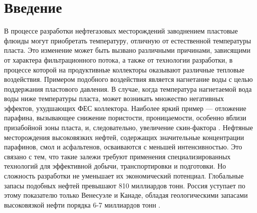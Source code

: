 \documentclass[12pt,twoside,a4paper]{uz_ku}
\begin{document}
\section*{Введение}

	В процессе разработки нефтегазовых месторождений заводнением пластовые флюиды могут приобретать температуру, отличную от естественной температуры пласта. Это изменение может быть вызвано различными причинами, зависящими от характера фильтрационного потока, а также от технологии разработки, в процессе которой на продуктивные коллекторы оказывают различные тепловые воздействия. Примером подобного воздействия является нагнетание воды с целью поддержания пластового давления. В случае, когда температура нагнетаемой вода воды ниже температуры пласта, может возникать множество негативных эффектов, ухудшающих ФЕС коллектора. Наиболее яркий пример — отложение парафина, вызывающее снижение пористости, проницаемости, особенно вблизи призабойной зоны пласта, и, следовательно, увеличение скин-фактора \cite{1}.
	Нефтяные месторождения высоковязких нефтей, содержащих значительные концентрации парафинов, смол и асфальтенов, осваиваются с меньшей интенсивностью. Это связано с тем, что такие залежи требуют применения специализированных технологий для эффективной добычи, транспортировки и подготовки. Но сложность разработки не уменьшает их экономический потенциал. Глобальные запасы подобных нефтей превышают 810 миллиардов тонн. Россия уступает по этому показателю только Венесуэле и Канаде, обладая геологическими запасами высоковязкой нефти порядка 6-7 миллиардов тонн \cite{1}.
\end{document}
